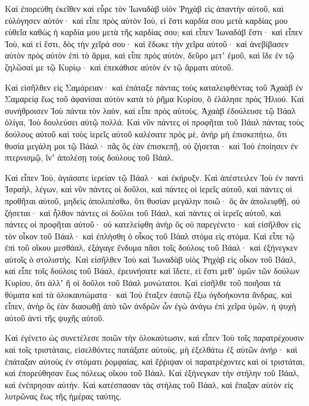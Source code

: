 {\par }{\PP {}Καὶ ἐπορεύθη ἐκεῖθεν καὶ εὗρε τὸν Ἰωναδὰβ υἱὸν Ῥηχὰβ εἰς ἀπαντὴν αὐτοῦ, καὶ εὐλόγησεν αὐτόν· καὶ εἶπε πρὸς αὐτὸν Ιοὺ, εἰ ἔστι καρδία σου μετὰ καρδίας μου εὐθεῖα καθὼς ἡ καρδία μου μετὰ τῆς καρδίας σου; καὶ εἶπεν Ἰωναδάβ ἔστι· καὶ εἶπεν Ἰοὺ, καὶ εἰ ἔστι, δὸς τὴν χεῖρά σου· καὶ ἔδωκε τὴν χεῖρα αὐτοῦ· καὶ ἀνεβίβασεν αὐτὸν πρὸς αὐτὸν ἐπὶ τὸ ἅρμα,
καὶ εἶπε πρὸς αὐτὸν, δεῦρο μετʼ ἐμοῦ, καὶ ἴδε ἐν τῷ ζηλῶσαί με τῷ Κυρίῳ· καὶ ἐπεκάθισε αὐτὸν ἐν τῷ ἅρματι αὐτοῦ.
\par }{\PP {}Καὶ εἰσῆλθεν εἰς Σαμάρειαν· καὶ ἐπάταξε πάντας τοὺς καταλειφθέντας τοῦ Ἀχαὰβ ἐν Σαμαρείᾳ ἕως τοῦ ἀφανίσαι αὐτὸν κατὰ τὸ ῥῆμα Κυρίου, ὃ ἐλάλησε πρὸς Ἠλιού.
Καὶ συνήθροισεν Ἰοὺ πάντα τὸν λαὸν, καὶ εἶπε πρὸς αὐτοὺς, Ἀχαὰβ ἐδούλευσε τῷ Βάαλ ὀλίγα, Ἰοὺ δουλεύσει αὐτῷ πολλά.
Καὶ νῦν πάντες οἱ προφῆται τοῦ Βάαλ πάντας τοὺς δούλους αὐτοῦ καὶ τοὺς ἱερεῖς αὐτοῦ καλέσατε πρὸς μὲ, ἀνὴρ μὴ ἐπισκεπήτω, ὅτι θυσία μεγάλη μοι τῷ Βάαλ· πᾶς ὃς ἐὰν ἐπισκεπῇ, οὐ ζήσεται· καὶ Ἰοὺ ἐποίησεν ἐν πτερνισμῷ, ἵνʼ ἀπολέσῃ τοὺς δούλους τοῦ Βάαλ.
\par }{\PP {}Καὶ εἶπεν Ἰοὺ, ἁγιάσατε ἱερείαν τῷ Βάαλ· καὶ ἐκήρυξν.
Καὶ ἀπέστειλεν Ἰοὺ ἐν παντὶ Ἰσραὴλ, λέγων, καὶ νῦν πάντες οἱ δοῦλοι, καὶ πάντες οἱ ἱερεῖς αὐτοῦ, καὶ πάντες οἱ προθῆται αὐτοῦ, μηδεὶς ἀπολιπέσθω, ὅτι θυσίαν μεγάλην ποιῶ· ὃς ἂν ἀπολειφθῇ, οὐ ζήσεται· καὶ ἦλθον πάντες οἱ δοῦλοι τοῦ Βάαλ, καὶ πάντες οἱ ἱερεῖς αὐτοῦ, καὶ πάντες οἱ προφῆται αὐτοῦ· οὐ κατελείφθη ἀνὴρ ὃς οὐ παρεγένετο· καὶ εἰσῆλθον εἰς τὸν οἶκον τοῦ Βάαλ· καὶ ἐπλήσθη ὁ οἶκος τοῦ Βάαλ στόμα εἰς στόμα.
Καὶ εἶπε τῷ ἐπὶ τοῦ οἴκου μεσθάαλ, ἐξάγαγε ἔνδυμα πᾶσι τοῖς δούλοις τοῦ Βάαλ· καὶ ἐξήνεγκεν αὐτοῖς ὁ στολιστής.
Καὶ εἰσῆλθεν Ἰοὺ καὶ Ἰωναδὰβ υἱὸς Ῥηχὰβ εἰς οἶκον τοῦ Βάαλ, καὶ εἶπε τοῖς δούλοις τοῦ Βάαλ, ἐρευνήσατε καὶ ἴδετε, εἰ ἔστι μεθʼ ὑμῶν τῶν δούλων Κυρίου, ὅτι ἀλλʼ ἢ οἱ δοῦλοι τοῦ Βάαλ μονώτατοι.
Καὶ εἰσῆλθε τοῦ ποιῆσαι τὰ θύματα καὶ τὰ ὁλοκαυτώματα· καὶ Ἰοὺ ἔταξεν ἑαυτῷ ἔξω ὀγδοήκοντα ἄνδρας, καὶ εἶπεν, ἀνὴρ ὃς ἐὰν διασωθῇ ἀπὸ τῶν ἀνδρῶν ὧν ἐγὼ ἀνάγω ἐπὶ χεῖρα ὑμῶν, ἡ ψυχὴ αὐτοῦ ἀντὶ τῆς ψυχῆς αὐτοῦ.
\par }{\PP {}Καὶ ἐγένετο ὡς συνετέλεσε ποιῶν τὴν ὁλοκαύτωσιν, καὶ εἶπεν Ἰοὺ τοῖς παρατρέχουσιν καὶ τοῖς τριστάταις, εἰσελθόντες πατάξατε αὐτοὺς, μὴ ἐξελθάτω ἐξ αὐτῶν ἀνήρ· καὶ ἐπάταξαν αὐτοὺς ἐν στόματι ῥομφαίας, καὶ ἔῤῥιψαν οἱ παρατρέχοντες καὶ οἱ τριστάται, καὶ ἐπορεύθησαν ἕως πόλεως οἴκου τοῦ Βάαλ.
Καὶ ἐξήνεγκαν τὴν στήλην τοῦ Βάαλ, καὶ ἐνέπρησαν αὐτήν.
Καὶ κατέσπασαν τὰς στήλας τοῦ Βάαλ, καὶ ἔπαξαν αὐτὸν εἰς λυτρῶνας ἕως τῆς ἡμέρας ταύτης.
}
